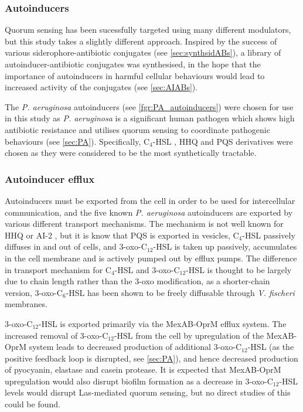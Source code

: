 \subsubsection{Autoinducers}

Quorum sensing has been sucessfully targeted using many different modulators\cite{Galloway2011,Hodgkinson2011}, but this study takes a slightly different approach. 
Inspired by the success of various siderophore-antibiotic conjugates (see \ref{sec:synthsidABs}), a library of autoinducer-antibiotic conjugates was synthesised, in the hope that the importance of autoinducers in harmful cellular behaviours would lead to increased activity of the conjugates (see \ref{sec:AIABs}).

The \textit{P. aeruginosa} autoinducers (see \ref{fgr:PA_autoinducers}) were chosen for use in this study as \textit{P. aeruginosa} is a significant human pathogen which shows high antibiotic resistance and utilises quorum sensing to coordinate pathogenic behaviours (see \ref{sec:PA}). 
Specifically, C$_4$-HSL , HHQ  and PQS  derivatives were chosen as they were considered to be the most synthetically tractable.

\subsubsection{Autoinducer efflux\label{sec:AI_eff}}

Autoinducers must be exported from the cell in order to be used for intercellular communication, and the five known \textit{P. aeruginosa} autoinducers are exported by various different transport mechanisms.
The mechanism is not well known for HHQ  or AI-2 , but it is know that
PQS  is exported in vesicles\cite{Florez2017},
C$_4$-HSL  passively diffuses in and out of cells\cite{Pearson1999}, and
3-oxo-C$_{12}$-HSL  is taken up passively, accumulates in the cell membrane and is actively pumped out by efflux pumps.
The difference in transport mechanism for C$_4$-HSL  and 3-oxo-C$_{12}$-HSL  is thought to be largely due to chain length rather than the 3-oxo modification, as a shorter-chain version, 3-oxo-C$_6$-HSL  has been shown to be freely diffusable through \textit{V. fischeri} membranes\cite{Kaplan1985}.

3-oxo-C$_{12}$-HSL  is exported primarily via the MexAB-OprM efflux system\cite{Evans1998,Poole2004}.
The increased removal of 3-oxo-C$_{12}$-HSL  from the cell by upregulation of the MexAB-OprM system leads to decreased production of additional 3-oxo-C$_{12}$-HSL  (as the positive feedback loop is disrupted, see \ref{sec:PA}), and hence decreased production of pyocyanin, elastase and casein protease. 
It is expected that MexAB-OprM upregulation would also disrupt biofilm formation as a decrease in 3-oxo-C$_{12}$-HSL  levels would disrupt Las-mediated quorum sensing\cite{Davies1998}, but no direct studies of this could be found.

